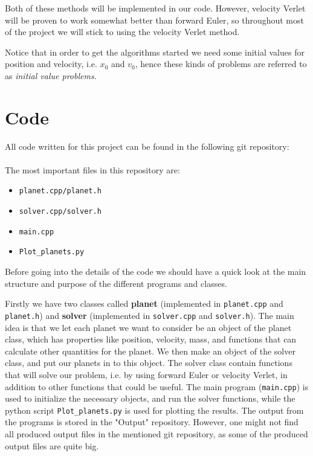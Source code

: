 \documentclass[12pt, a4paper]{article}
\begin{document}
Both of these methods will be implemented in our code. However, velocity Verlet will be 
proven to work somewhat better than forward Euler, so throughout most of the project we 
will stick to using the velocity Verlet method. 

Notice that in order to get the algorithms started we need some initial values for position and velocity,
i.e. $x_0$ and $v_0$, hence these kinds of problems are referred to as \textit{initial value problems}.   

\section{Code}

All code written for this project can be found in the following git repository: \vspace{0.5cm} \\ 
 \vspace{0.5cm} \\ 
The most important files in this repository are:  
\begin{itemize}
\item \texttt{planet.cpp/planet.h}
\item \texttt{solver.cpp/solver.h}
\item \texttt{main.cpp}
\item \texttt{Plot\_planets.py}
\end{itemize}
Before going into the details of the code we should have a quick look at the main structure and purpose 
of the different programs and classes. 

Firstly we have two classes called \textbf{planet} (implemented in \texttt{planet.cpp} and 
\texttt{planet.h}) and \textbf{solver} (implemented in \texttt{solver.cpp} and \texttt{solver.h}). 
The main idea is that we let each planet we want to consider be an object of the planet class, 
which has properties like position, velocity, mass, and functions that can calculate other quantities 
for the planet. We then make an object of the solver class, and put our planets in to this object. 
The solver class contain functions that will solve our problem, i.e. by using forward Euler or 
velocity Verlet, in addition to other functions that could be useful. The main program (\texttt{main.cpp}) 
is used to initialize the necessary objects, and run the solver functions, while the python script 
\texttt{Plot\_planets.py} is used for plotting the results. The output from the programs is stored in 
the "Output" repository. However, one might not find all produced output files in the mentioned git 
repository, as some of the produced output files are quite big.  
\end{document}
